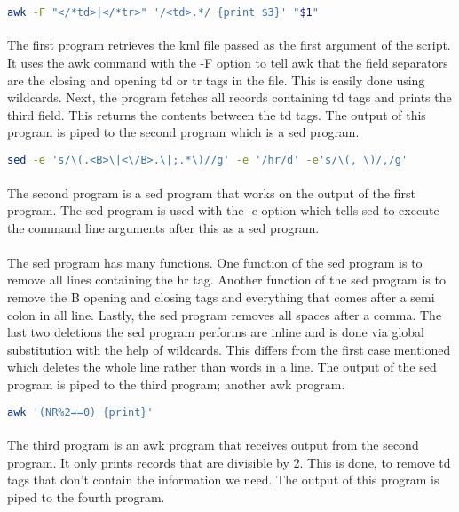\documentclass[]{article}
\begin{document}
\begin{lstlisting}[language=Bash, caption = First program]
awk -F "</*td>|</*tr>" '/<td>.*/ {print $3}' "$1" 
\end{lstlisting}
\paragraph{}The first program retrieves the kml file passed as the first argument of the script. It uses the awk command with the -F option to tell awk that the field separators are the closing and opening td or tr tags in the file. This is easily done using wildcards. Next, the program fetches all records containing td tags and prints the third field. This returns the contents between the td tags. The output of this program is piped to the second program which is a sed program.

\begin{lstlisting}[language=Bash, caption = Second program]
sed -e 's/\(.<B>\|<\/B>.\|;.*\)//g' -e '/hr/d' -e's/\(, \)/,/g'
\end{lstlisting}
\paragraph{}The second program is a sed program that works on the output of the first program. The sed program is used with the -e option which tells sed to execute the command line arguments after this as a sed program. 
\paragraph{}The sed program has many functions. One function of the sed program is to remove all lines containing the hr tag. Another function of the sed program is to remove the B opening and closing tags and everything that comes after a semi colon in all line. Lastly, the sed program removes all spaces after a comma. The last two deletions the sed program performs are inline and is done via global substitution with the help of wildcards. This differs from the first case mentioned which deletes the whole line rather than words in a line. The output of the sed program is piped to the third program; another awk program.

\begin{lstlisting}[language=Bash, caption = Third program]
awk '(NR%2==0) {print}'
\end{lstlisting}
\paragraph{}The third program is an awk program that receives output from the second program. It only prints records that are divisible by 2. This is done, to remove td tags that don't contain the information we need. The output of this program is piped to the fourth program.
\end{document}
